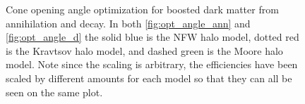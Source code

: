 \begin{figure}
	\centering
	\caption{Cone opening angle optimization for boosted dark matter from annihilation and decay.  In both \ref{fig:opt_angle_ann} and \ref{fig:opt_angle_d} the solid blue is the NFW halo model, dotted red is the Kravtsov halo model, and dashed green is the Moore halo model.  Note since the scaling is arbitrary, the efficiencies have been scaled by different amounts for each model so that they can all be seen on the same plot.}
	\label{fig:opt_angle}
\end{figure}





